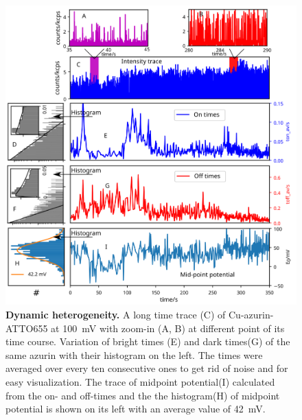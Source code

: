 \begin{figure}
	\centering
	\includegraphics[width=\textwidth]{long_azurin_trace}
	\caption{\textbf{Dynamic heterogeneity.} A long time trace (C) of Cu-azurin-ATTO655 at \SI{100}{\mV} with zoom-in (A, B) at different point of its time course.
	Variation of bright times (E) and dark times(G) of the same azurin with their histogram on the left.
	The times were averaged over every ten consecutive ones to get rid of noise and for easy visualization.
	The trace of midpoint potential(I) calculated from the on- and off-times and the the histogram(H) of midpoint potential is shown on its left with an average value of \SI{42}{\mV}.
	}
	\label{fig:long_azurin_trace}
\end{figure}

